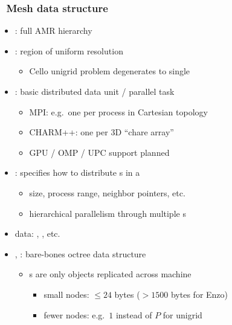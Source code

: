 \begin{frame}[fragile] 
\frametitle{\cello\ Mesh data structure}
\begin{itemize}
\small
\item {}: full AMR hierarchy
\item {}: region of uniform resolution
  \begin{itemize}
  \item Cello unigrid problem degenerates to single 
  \end{itemize}
\item {}: basic distributed data unit / parallel task
  \begin{itemize}
  \item MPI: e.g.~one  per process in Cartesian topology
  \item CHARM++: one  per 3D ``chare array''
  \item GPU / OMP / UPC support planned
  \end{itemize}
\item {}: specifies how to distribute s in a 
  \begin{itemize}
  \item {} size, process range, neighbor pointers, etc.
  \item hierarchical parallelism through multiple s
  \end{itemize}
\item {} data: , , etc.
\item {}, : bare-bones octree data structure
  \begin{itemize}
  \item {}s are only objects replicated across machine
    \begin{itemize}
    \item small nodes: $\le 24$ bytes ($>1500$ bytes for Enzo)
    \item fewer nodes: e.g.~$1$ instead of $P$ for unigrid
    \end{itemize}
  \end{itemize}
\end{itemize}

\end{frame}





